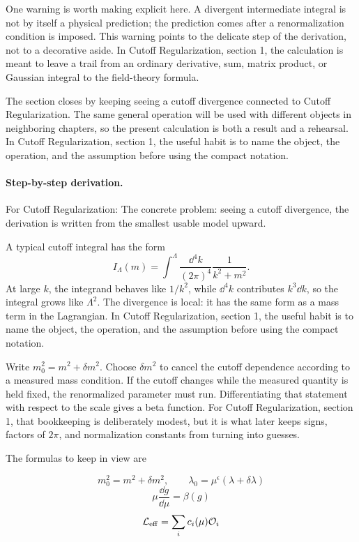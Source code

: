 One warning is worth making explicit here.  A divergent intermediate integral is not by itself a physical prediction; the prediction comes after a renormalization condition is imposed.  This warning points to the delicate step of the derivation, not to a decorative aside.  In Cutoff Regularization, section 1, the calculation is meant to leave a trail from an ordinary derivative, sum, matrix product, or Gaussian integral to the field-theory formula.

The section closes by keeping seeing a cutoff divergence connected to Cutoff Regularization.  The same general operation will be used with different objects in neighboring chapters, so the present calculation is both a result and a rehearsal.  In Cutoff Regularization, section 1, the useful habit is to name the object, the operation, and the assumption before using the compact notation.



\paragraph{Step-by-step derivation.}

For Cutoff Regularization: The concrete problem: seeing a cutoff divergence, the derivation is written from the smallest usable model upward.

A typical cutoff integral has the form
\[
  I_\Lambda(m)=\int^{\Lambda}\frac{\dd^4k}{(2\pi)^4}\frac{1}{k^2+m^2}.
\]
At large \(k\), the integrand behaves like \(1/k^2\), while \(\dd^4k\) contributes \(k^3\dd k\), so the integral grows like \(\Lambda^2\).  The divergence is local: it has the same form as a mass term in the Lagrangian.  In Cutoff Regularization, section 1, the useful habit is to name the object, the operation, and the assumption before using the compact notation.

Write \(m_0^2=m^2+\delta m^2\).  Choose \(\delta m^2\) to cancel the cutoff dependence according to a measured mass condition.  If the cutoff changes while the measured quantity is held fixed, the renormalized parameter must run.  Differentiating that statement with respect to the scale gives a beta function.  For Cutoff Regularization, section 1, that bookkeeping is deliberately modest, but it is what later keeps signs, factors of \(2\pi\), and normalization constants from turning into guesses.

The formulas to keep in view are

\[
  m_0^2=m^2+\delta m^2,\qquad \lambda_0=\mu^\epsilon(\lambda+\delta\lambda)
\]
\[
  \mu\frac{\dd g}{\dd\mu}=\beta(g)
\]
\[
  \mathcal L_{\mathrm{eff}}=\sum_i c_i(\mu)\mathcal O_i
\]

